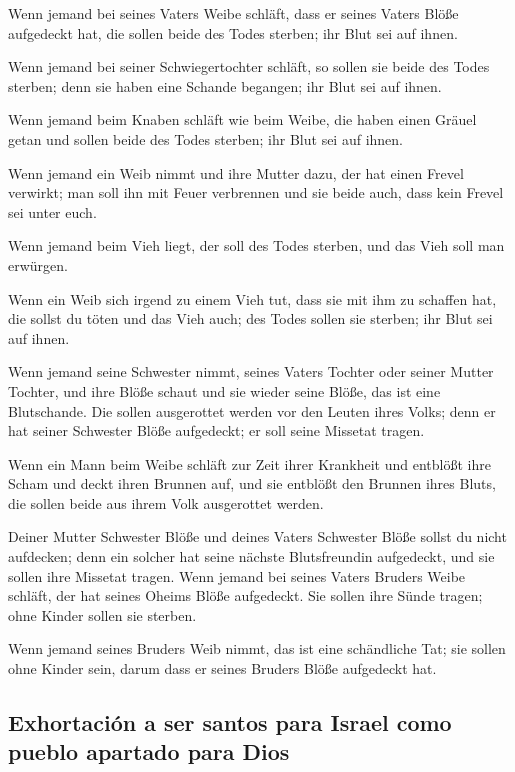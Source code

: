  Wenn jemand bei seines Vaters Weibe schläft, dass er
seines Vaters Blöße aufgedeckt hat, die sollen beide des Todes sterben;
ihr Blut sei auf ihnen.

 Wenn jemand bei seiner Schwiegertochter schläft, so
sollen sie beide des Todes sterben; denn sie haben eine Schande
begangen; ihr Blut sei auf ihnen.

 Wenn jemand beim Knaben schläft wie beim Weibe, die
haben einen Gräuel getan und sollen beide des Todes sterben; ihr Blut
sei auf ihnen.

 Wenn jemand ein Weib nimmt und ihre Mutter dazu, der hat
einen Frevel verwirkt; man soll ihn mit Feuer verbrennen und sie beide
auch, dass kein Frevel sei unter euch.

 Wenn jemand beim Vieh liegt, der soll des Todes sterben,
und das Vieh soll man erwürgen.

 Wenn ein Weib sich irgend zu einem Vieh tut, dass sie
mit ihm zu schaffen hat, die sollst du töten und das Vieh auch; des
Todes sollen sie sterben; ihr Blut sei auf ihnen.

 Wenn jemand seine Schwester nimmt, seines Vaters Tochter
oder seiner Mutter Tochter, und ihre Blöße schaut und sie wieder seine
Blöße, das ist eine Blutschande. Die sollen ausgerottet werden vor den
Leuten ihres Volks; denn er hat seiner Schwester Blöße aufgedeckt; er
soll seine Missetat tragen.

 Wenn ein Mann beim Weibe schläft zur Zeit ihrer
Krankheit und entblößt ihre Scham und deckt ihren Brunnen auf, und sie
entblößt den Brunnen ihres Bluts, die sollen beide aus ihrem Volk
ausgerottet werden.

 Deiner Mutter Schwester Blöße und deines Vaters
Schwester Blöße sollst du nicht aufdecken; denn ein solcher hat seine
nächste Blutsfreundin aufgedeckt, und sie sollen ihre Missetat tragen.
 Wenn jemand bei seines Vaters Bruders Weibe schläft, der
hat seines Oheims Blöße aufgedeckt. Sie sollen ihre Sünde tragen; ohne
Kinder sollen sie sterben.

 Wenn jemand seines Bruders Weib nimmt, das ist eine
schändliche Tat; sie sollen ohne Kinder sein, darum dass er seines
Bruders Blöße aufgedeckt hat.

\hypertarget{exhortaciuxf3n-a-ser-santos-para-israel-como-pueblo-apartado-para-dios}{%
\subsection{Exhortación a ser santos para Israel como pueblo apartado
para
Dios}\label{exhortaciuxf3n-a-ser-santos-para-israel-como-pueblo-apartado-para-dios}}

